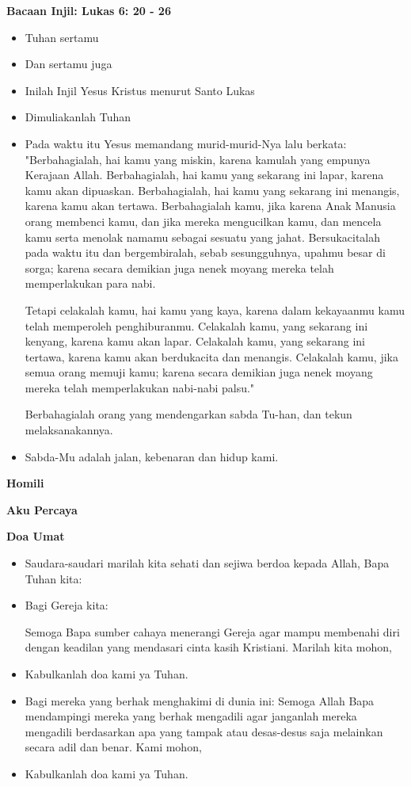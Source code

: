 \documentclass[12pt]{scrartcl}
\makeatletter
\newcommand{\subjudul}[1]{%
  {\parindent \z@ \normalfont
    \interlinepenalty\@M \bfseries #1\par\nobreak \vskip 20\p@ }}
\newcommand{\BU}[1]{\begin{itemize} \item[U:] #1 \end{itemize}}
\newcommand{\BI}[1]{\begin{itemize} \item[I:] #1 \end{itemize}}
\newcommand{\BP}[1]{\begin{itemize} \item[P:] #1 \end{itemize}}
\makeatother
\begin{document}
\subjudul{Bacaan Injil: Lukas 6: 20 - 26}

\BI{Tuhan sertamu}

\BU{Dan sertamu juga}

\BI{Inilah Injil Yesus Kristus menurut Santo Lukas}

\BU{Dimuliakanlah Tuhan}

\BI{Pada waktu itu Yesus memandang murid-murid-Nya lalu berkata: "Berbahagialah, hai kamu yang miskin, karena kamulah yang empunya Kerajaan Allah.
	Berbahagialah, hai kamu yang sekarang ini lapar, karena kamu akan dipuaskan. Berbahagialah, hai kamu yang sekarang ini menangis, karena kamu akan tertawa.
	Berbahagialah kamu, jika karena Anak Manusia orang membenci kamu, dan jika mereka mengucilkan kamu, dan mencela kamu serta menolak namamu sebagai sesuatu yang jahat.
	Bersukacitalah pada waktu itu dan bergembiralah, sebab sesungguhnya, upahmu besar di sorga; karena secara demikian juga nenek moyang mereka telah memperlakukan para nabi.
	
	Tetapi celakalah kamu, hai kamu yang kaya, karena dalam kekayaanmu kamu telah memperoleh penghiburanmu.
	Celakalah kamu, yang sekarang ini kenyang, karena kamu akan lapar. Celakalah kamu, yang sekarang ini tertawa, karena kamu akan berdukacita dan menangis.
	Celakalah kamu, jika semua orang memuji kamu; karena secara demikian juga nenek moyang mereka telah memperlakukan nabi-nabi palsu."
	
Berbahagialah orang yang mendengarkan sabda Tu-han, dan tekun melaksanakannya.}

\BU{Sabda-Mu adalah jalan, kebenaran dan hidup kami.}

\subjudul{Homili}

\subjudul{Aku Percaya}

\subjudul{Doa Umat}
\BI{Saudara-saudari marilah kita sehati dan sejiwa berdoa kepada Allah, Bapa Tuhan kita:}
\BP{Bagi Gereja kita: 
	
	Semoga Bapa sumber cahaya menerangi Gereja agar mampu membenahi diri dengan keadilan yang mendasari cinta kasih Kristiani. Marilah kita  mohon, }

\BU{Kabulkanlah doa kami ya Tuhan.}

\BP{Bagi mereka yang berhak menghakimi di dunia ini: Semoga Allah Bapa mendampingi mereka yang berhak mengadili agar janganlah mereka mengadili berdasarkan apa yang tampak atau desas-desus saja melainkan secara adil dan benar. Kami mohon,}

\BU{Kabulkanlah doa kami ya Tuhan.}
\end{document}
